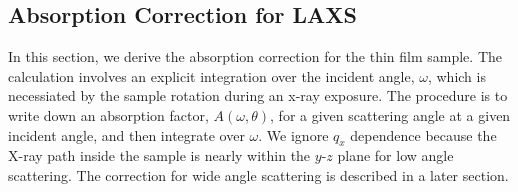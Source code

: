 \subsection{Absorption Correction for LAXS}
In this section, we derive the absorption correction for the thin film
sample. The calculation involves an explicit integration over the incident angle, 
$\omega$, which is necessiated by the sample rotation during an x-ray exposure. 
The procedure is to write down an absorption factor, $A(\omega,\theta)$, for a 
given scattering angle at a given incident angle, and
then integrate over $\omega$. We ignore $q_x$ dependence because the X-ray
path inside the sample is nearly within the $y$-$z$ plane for low angle
scattering. The correction for wide angle scattering is described in a later
section.

